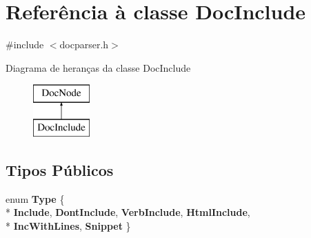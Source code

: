 \hypertarget{class_doc_include}{\section{Referência à classe Doc\-Include}
\label{class_doc_include}
}


{\ttfamily \#include $<$docparser.\-h$>$}

Diagrama de heranças da classe Doc\-Include\begin{figure}[H]
\begin{center}
\leavevmode
\includegraphics[height=2.000000cm]{class_doc_include}
\end{center}
\end{figure}
\subsection*{Tipos Públicos}
\begin{DoxyCompactItemize}
\item 
enum {\bfseries Type} \{ \\*
{\bfseries Include}, 
{\bfseries Dont\-Include}, 
{\bfseries Verb\-Include}, 
{\bfseries Html\-Include}, 
\\*
{\bfseries Inc\-With\-Lines}, 
{\bfseries Snippet}
 \}
\end{DoxyCompactItemize}
